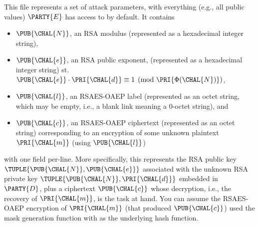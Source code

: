 \documentclass[crop={false},multi={true},tikz={true}]{standalone}
\begin{document}
This file represents a set of attack parameters, with everything (e.g.,
all public values) $\PARTY{E}$ has access to by default.  It contains 

\begin{itemize}
\item $\PUB{\CHAL{N}}$,     
      an RSA        modulus
      (represented as a  hexadecimal integer string),      
\item $\PUB{\CHAL{e}}$,
      an RSA        public exponent,
      (represented as a  hexadecimal integer string)
      st. $\PUB{\CHAL{e}} \cdot \PRI{\CHAL{d}} \equiv 1 \pmod{\PRI{\Phi{(\CHAL{N})}}}$,
\item $\PUB{\CHAL{l}}$,
      an RSAES-OAEP label
      (represented as an               octet string, which may be empty, i.e., a blank link meaning a $0$-octet string),
      and
\item $\PUB{\CHAL{c}}$,
      an RSAES-OAEP ciphertext 
      (represented as an               octet string)
      corresponding to an encryption of some unknown plaintext 
      $\PRI{\CHAL{m}}$ (using $\PUB{\CHAL{l}}$)
\end{itemize}

\noindent
with one field per-line.
More specifically, this represents the RSA public key 
$
\TUPLE{ \PUB{\CHAL{N}}, \PUB{\CHAL{e}} }
$
associated with the unknown RSA private key 
$
\TUPLE{ \PUB{\CHAL{N}}, \PRI{\CHAL{d}} } 
$
embedded in $\PARTY{D}$, 
plus a ciphertext $\PUB{\CHAL{c}}$ whose decryption, i.e., the recovery 
of $\PRI{\CHAL{m}}$, is the task at hand.  You can assume the RSAES-OAEP 
encryption of $\PRI{\CHAL{m}}$ (that produced $\PUB{\CHAL{c}}$) used the
 mask generation function with 
 as the underlying hash function.
%
\end{document}
